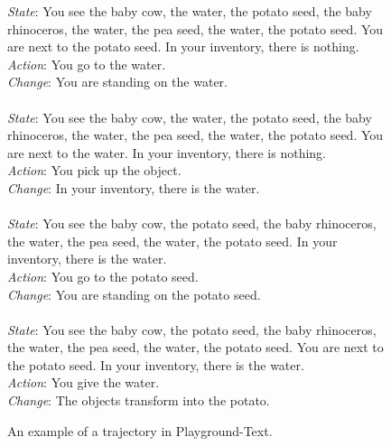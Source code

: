 \documentclass{article}
\begin{document}
\begin{figure}[hbt]
\begin{promptbox}{}
\textit{State}:
You see the baby cow, the water, the potato seed, the baby rhinoceros, the water, the pea seed, the water, the potato seed. You are next to the potato seed. In your inventory, there is nothing. \\
\textit{Action}: 
You go to the water. \\
\textit{Change}: 
You are standing on the water. \\ \\
\textit{State}:
You see the baby cow, the water, the potato seed, the baby rhinoceros, the water, the pea seed, the water, the potato seed. You are next to the water. In your inventory, there is nothing. \\
\textit{Action}: 
You pick up the object. \\
\textit{Change}: 
In your inventory, there is the water. \\ \\
\textit{State}:
You see the baby cow, the potato seed, the baby rhinoceros, the water, the pea seed, the water, the potato seed. In your inventory, there is the water.\\
\textit{Action}: 
You go to the potato seed. \\
\textit{Change}: 
You are standing on the potato seed. \\ \\
\textit{State}:
You see the baby cow, the potato seed, the baby rhinoceros, the water, the pea seed, the water, the potato seed. You are next to the potato seed. In your inventory, there is the water. \\
\textit{Action}: 
You give the water. \\
\textit{Change}: 
The objects transform into the potato. \\
\end{promptbox}
\caption{An example of a trajectory in Playground-Text.}
\label{fig:PlaygroundState}
\end{figure}
\end{document}
